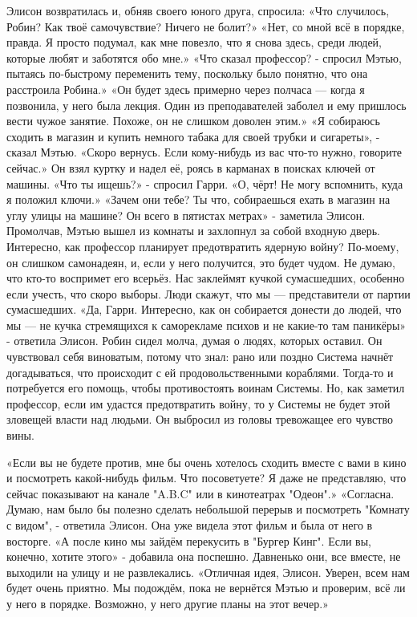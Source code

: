 \documentclass[a4paper,12pt]{book}
\begin{document}
	Элисон возвратилась и, обняв своего юного друга, спросила:
	«Что случилось, Робин? Как твоё самочувствие? Ничего не болит?»
	«Нет, со мной всё в порядке, правда. Я просто подумал, как мне повезло, что я снова здесь, среди людей, которые любят и заботятся обо мне.»
	«Что сказал профессор? - спросил Мэтью, пытаясь по-быстрому переменить тему, поскольку было понятно, что она расстроила Робина.»
	«Он будет здесь примерно через полчаса — когда я позвонила, у него была лекция. Один из преподавателей заболел и ему пришлось вести чужое занятие. Похоже, он не слишком доволен этим.»
	«Я собираюсь сходить в магазин и купить немного табака для своей трубки и сигареты», - сказал Мэтью.
	«Скоро вернусь. Если кому-нибудь из вас что-то нужно, говорите сейчас.»
	Он взял куртку и надел её, роясь в карманах в поисках ключей от машины.
	«Что ты ищешь?» - спросил Гарри.
	 «О, чёрт! Не могу вспомнить, куда я положил ключи.»
	«Зачем они тебе? Ты что, собираешься ехать в магазин на углу улицы на машине? Он всего в пятистах метрах» - заметила Элисон.
	Промолчав, Мэтью вышел из комнаты и захлопнул за собой входную дверь.
	Интересно, как профессор планирует предотвратить ядерную войну? По-моему, он слишком самонадеян, и, если у него получится, это будет чудом. Не думаю, что кто-то воспримет его всерьёз. Нас заклеймят кучкой сумасшедших, особенно если учесть, что скоро выборы. Люди скажут, что мы — представители от партии сумасшедших.
	«Да, Гарри. Интересно, как он собирается донести до людей, что мы — не кучка стремящихся к саморекламе психов и не какие-то там паникёры» - ответила Элисон.
	Робин сидел молча, думая о людях, которых оставил. Он чувствовал себя виноватым, потому что знал: рано или поздно Система начнёт догадываться, что происходит с ей продовольственными кораблями. Тогда-то и потребуется его помощь, чтобы противостоять воинам Системы. Но, как заметил профессор, если им удастся предотвратить войну, то у Системы не будет этой зловещей власти над людьми. Он выбросил из головы тревожащее его чувство вины.

	«Если вы не будете против, мне бы очень хотелось сходить вместе с вами в кино и посмотреть какой-нибудь фильм. Что посоветуете? Я даже не представляю, что сейчас показывают на канале "A.B.C" или в кинотеатрах "Одеон".»	
	«Согласна. Думаю, нам было бы полезно сделать небольшой перерыв и посмотреть "Комнату с видом", - ответила Элисон. Она уже видела этот фильм и была от него в восторге.
	«А после кино мы зайдём перекусить в "Бургер Кинг". Если вы, конечно, хотите этого» - добавила она поспешно. Давненько они, все вместе, не выходили на улицу и не развлекались.
	«Отличная идея, Элисон. Уверен, всем нам будет очень приятно. Мы подождём, пока не вернётся Мэтью и проверим, всё ли у него в порядке. Возможно, у него другие планы на этот вечер.»
\end{document}
